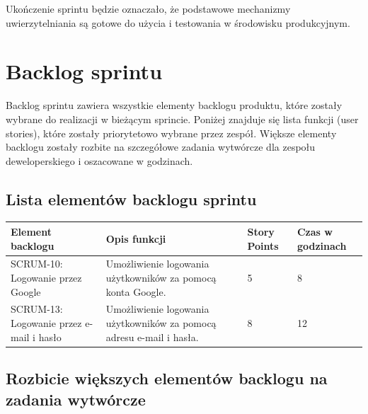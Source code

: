 \documentclass[12pt,a4paper,colorlinks=true,linkcolor=NavyBlue,citecolor=red,urlcolor=NavyBlue]{book}
\begin{document}
\vspace{1em}
Ukończenie sprintu będzie oznaczało, że podstawowe mechanizmy uwierzytelniania są gotowe do użycia i testowania w środowisku produkcyjnym.


\newpage
\thispagestyle{empty}
\null
\newpage

\chapter{Backlog sprintu}

Backlog sprintu zawiera wszystkie elementy backlogu produktu, które zostały wybrane do realizacji w bieżącym sprincie. Poniżej znajduje się lista funkcji (user stories), które zostały priorytetowo wybrane przez zespół. Większe elementy backlogu zostały rozbite na szczegółowe zadania wytwórcze dla zespołu deweloperskiego i oszacowane w godzinach.

\section{Lista elementów backlogu sprintu}
\begin{center}
\begin{tabular}{|p{4cm}|p{6cm}|p{2.5cm}|p{2.5cm}|}
\hline
\textbf{Element backlogu} & \textbf{Opis funkcji} & \textbf{Story Points} & \textbf{Czas w godzinach} \\
\hline
SCRUM-10: Logowanie przez Google & Umożliwienie logowania użytkowników za pomocą konta Google. & 5 & 8 \\
\hline
SCRUM-13: Logowanie przez e-mail i hasło & Umożliwienie logowania użytkowników za pomocą adresu e-mail i hasła. & 8 & 12 \\
\hline
\end{tabular}
\end{center}

\section{Rozbicie większych elementów backlogu na zadania wytwórcze}
\end{document}
